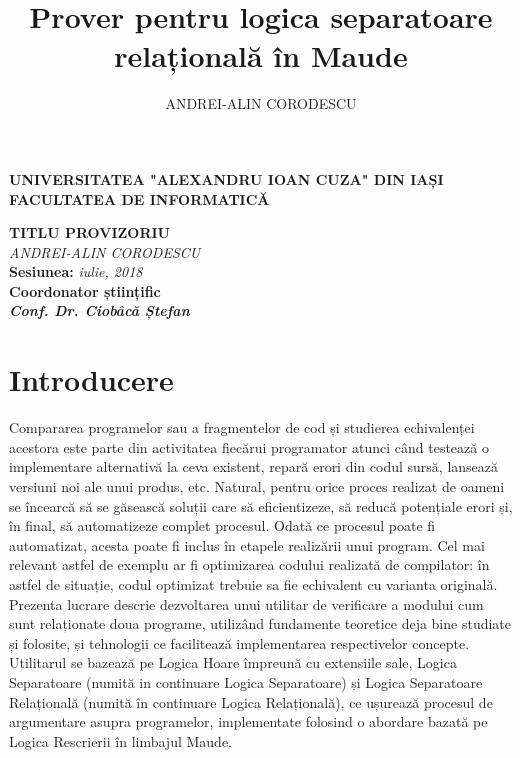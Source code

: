 \documentclass[12pt,a4paper]{article}
\author{ANDREI-ALIN CORODESCU}
\title{Prover pentru logica separatoare relațională în Maude}
\begin{document}
\begin{titlepage}
\begin{center}
\textbf{
UNIVERSITATEA "ALEXANDRU IOAN CUZA" DIN IAȘI
}
\\
\textbf{FACULTATEA DE INFORMATICĂ}
\end{center}
   \vspace{50mm}
\begin{center}
	\Large\textbf {TITLU PROVIZORIU}\\
	\vspace{30mm}
	\large\textit {ANDREI-ALIN CORODESCU}
	\\
	\vspace{20mm}
	\textbf{Sesiunea: }\textit{iulie, 2018}\\
	\vspace{30mm}
	\textbf{Coordonator științific}\\
	\textbf{\textit{Conf. Dr. Ciobâcă Ștefan}}
	\vspace{30mm}
\end{center}
\end{titlepage}
\tableofcontents
\pagebreak

\section{Introducere}
Compararea programelor sau a fragmentelor de cod și studierea echivalenței acestora este parte din activitatea fiecărui programator atunci când testează o implementare alternativă la ceva existent, repară erori din codul sursă, lansează versiuni noi ale unui produs, etc. Natural, pentru orice proces realizat de oameni se încearcă să se găsească soluții care să eficientizeze, să reducă potențiale erori și, în final, să automatizeze complet procesul. Odată ce procesul poate fi automatizat, acesta poate fi inclus în etapele realizării unui program. Cel mai relevant astfel de exemplu ar fi optimizarea codului realizată de compilator: în astfel de situație, codul optimizat trebuie sa fie echivalent cu varianta originală. \\

Prezenta lucrare descrie dezvoltarea  unui utilitar de verificare a modului cum sunt relaționate doua programe, utilizând fundamente teoretice deja bine studiate și folosite, și tehnologii ce facilitează implementarea respectivelor concepte. \\

Utilitarul se bazează pe Logica Hoare împreună cu extensiile sale, Logica Separatoare (numită in continuare Logica Separatoare) și Logica Separatoare Relațională (numită în continuare Logica Relațională), ce ușurează procesul de argumentare asupra programelor, implementate folosind o abordare bazată pe Logica Rescrierii în limbajul Maude. \\
\end{document}
